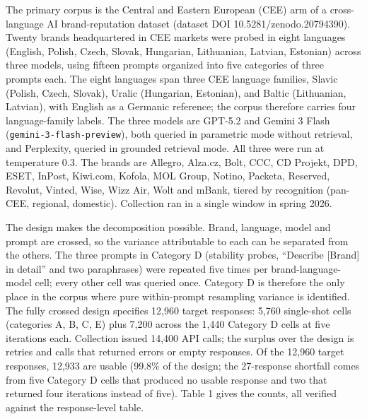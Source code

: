 \documentclass[pdflatex,sn-mathphys-num]{sn-jnl}
\begin{document}
The primary corpus is the Central and Eastern European (CEE) arm of a cross-language AI brand-reputation dataset \cite{ref20} (dataset DOI 10.5281/zenodo.20794390). Twenty brands headquartered in CEE markets were probed in eight languages (English, Polish, Czech, Slovak, Hungarian, Lithuanian, Latvian, Estonian) across three models, using fifteen prompts organized into five categories of three prompts each. The eight languages span three CEE language families, Slavic (Polish, Czech, Slovak), Uralic (Hungarian, Estonian), and Baltic (Lithuanian, Latvian), with English as a Germanic reference; the corpus therefore carries four language-family labels. The three models are GPT-5.2 and Gemini 3 Flash (\texttt{gemini-3-flash-preview}), both queried in parametric mode without retrieval, and Perplexity, queried in grounded retrieval mode. All three were run at temperature 0.3. The brands are Allegro, Alza.cz, Bolt, CCC, CD Projekt, DPD, ESET, InPost, Kiwi.com, Kofola, MOL Group, Notino, Packeta, Reserved, Revolut, Vinted, Wise, Wizz Air, Wolt and mBank, tiered by recognition (pan-CEE, regional, domestic). Collection ran in a single window in spring 2026.

The design makes the decomposition possible. Brand, language, model and prompt are crossed, so the variance attributable to each can be separated from the others. The three prompts in Category D (stability probes, ``Describe {[}Brand{]} in detail'' and two paraphrases) were repeated five times per brand-language-model cell; every other cell was queried once. Category D is therefore the only place in the corpus where pure within-prompt resampling variance is identified. The fully crossed design specifies 12,960 target responses: 5,760 single-shot cells (categories A, B, C, E) plus 7,200 across the 1,440 Category D cells at five iterations each. Collection issued 14,400 API calls; the surplus over the design is retries and calls that returned errors or empty responses. Of the 12,960 target responses, 12,933 are usable (99.8\% of the design; the 27-response shortfall comes from five Category D cells that produced no usable response and two that returned four iterations instead of five). Table 1 gives the counts, all verified against the response-level table.
\end{document}
